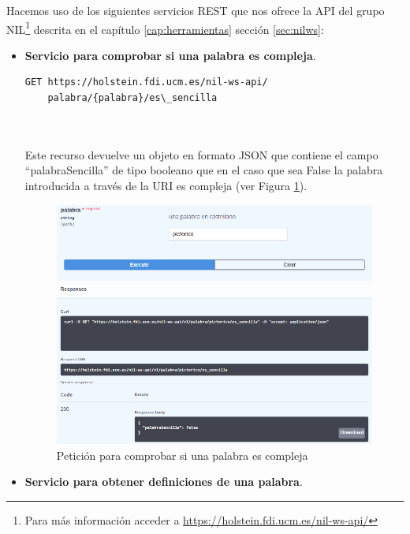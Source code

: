   Hacemos uso de los siguientes servicios REST que nos ofrece la API del grupo NIL\footnote{Para más información acceder a \href{https://holstein.fdi.ucm.es/nil-ws-api/}{https://holstein.fdi.ucm.es/nil-ws-api/}} descrita en el capítulo \ref{cap:herramientas} sección \ref{sec:nilws}:


	


\begin{itemize}
	\item \textbf{Servicio para comprobar si una palabra es compleja}.
	\begin{lstlisting}[backgroundcolor = \color{pink},
	xleftmargin = 1cm,
	framexleftmargin = 1em,frame=tlbr,framesep=4pt,framerule=1pt]
	GET https://holstein.fdi.ucm.es/nil-ws-api/
	palabra/{palabra}/es\_sencilla
	
	
\end{lstlisting}
	
	Este recurso devuelve un objeto en formato JSON que contiene el campo ``palabraSencilla'' de tipo booleano que en el caso que sea False la palabra introducida a través de la URI es compleja (ver Figura \ref{fig:apiSencilla}).
		 \begin{figure}[h!]
		\centering
		
		
		\includegraphics[scale=1]{Imagenes/Figuras/APISencilla}
		
		
		\caption{Petición para comprobar si una palabra es compleja}
		\label{fig:apiSencilla}
	\end{figure}
	\item \textbf{Servicio para obtener definiciones de una palabra}.



\end{itemize}
